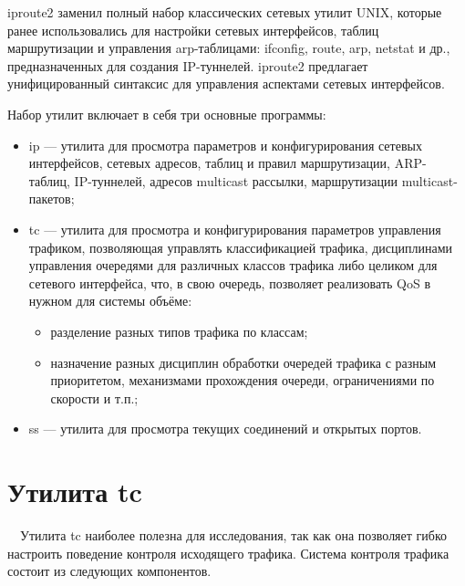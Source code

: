 \documentclass[
  13pt,
  fontsize=13pt,
  russian,
  a4paper,
,captions=tableheading
]{scrreprt}
\providecommand{\tightlist}{%
  \setlength{\itemsep}{0pt}\setlength{\parskip}{0pt}}
\begin{document}
iproute2 заменил полный набор классических сетевых утилит UNIX, которые
ранее использовались для настройки сетевых интерфейсов, таблиц
маршрутизации и управления arp-таблицами: ifconfig, route, arp, netstat
и др., предназначенных для создания IP-туннелей. iproute2 предлагает
унифицированный синтаксис для управления аспектами сетевых интерфейсов.

Набор утилит включает в себя три основные программы:

\begin{itemize}
\tightlist
\item
  ip \autocite{ip} --- утилита для просмотра параметров и
  конфигурирования сетевых интерфейсов, сетевых адресов, таблиц и правил
  маршрутизации, ARP-таблиц, IP-туннелей, адресов multicast рассылки,
  маршрутизации multicast-пакетов;
\item
  tc \autocite{tc} --- утилита для просмотра и конфигурирования
  параметров управления трафиком, позволяющая управлять классификацией
  трафика, дисциплинами управления очередями для различных классов
  трафика либо целиком для сетевого интерфейса, что, в свою очередь,
  позволяет реализовать QoS в нужном для системы объёме:

  \begin{itemize}
  \tightlist
  \item
    разделение разных типов трафика по классам;
  \item
    назначение разных дисциплин обработки очередей трафика с разным
    приоритетом, механизмами прохождения очереди, ограничениями по
    скорости и т.п.;
  \end{itemize}
\item
  ss \autocite{ss} --- утилита для просмотра текущих соединений и
  открытых портов.
\end{itemize}

\hypertarget{ux443ux442ux438ux43bux438ux442ux430-tc}{%
\section{Утилита tc}\label{ux443ux442ux438ux43bux438ux442ux430-tc}}

\(\quad\)Утилита tc \autocite{tc} наиболее полезна для исследования, так
как она позволяет гибко настроить поведение контроля исходящего трафика.
Система контроля трафика состоит из следующих компонентов.
\end{document}
